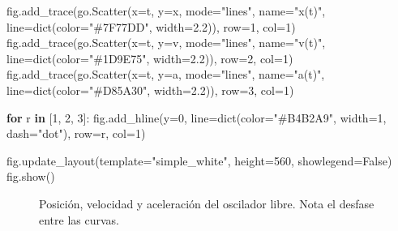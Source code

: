 \documentclass[
  letterpaper,
  DIV=11,
  numbers=noendperiod]{scrreprt}
\newenvironment{Shaded}{\begin{snugshade}}{\end{snugshade}}
\newcommand{\BuiltInTok}[1]{\textcolor[rgb]{0.00,0.23,0.31}{#1}}
\newcommand{\ControlFlowTok}[1]{\textcolor[rgb]{0.00,0.23,0.31}{\textbf{#1}}}
\newcommand{\DecValTok}[1]{\textcolor[rgb]{0.68,0.00,0.00}{#1}}
\newcommand{\FloatTok}[1]{\textcolor[rgb]{0.68,0.00,0.00}{#1}}
\newcommand{\KeywordTok}[1]{\textcolor[rgb]{0.00,0.23,0.31}{\textbf{#1}}}
\newcommand{\NormalTok}[1]{\textcolor[rgb]{0.00,0.23,0.31}{#1}}
\newcommand{\OperatorTok}[1]{\textcolor[rgb]{0.37,0.37,0.37}{#1}}
\newcommand{\StringTok}[1]{\textcolor[rgb]{0.13,0.47,0.30}{#1}}
\newcommand{\VariableTok}[1]{\textcolor[rgb]{0.07,0.07,0.07}{#1}}
\begin{document}
\begin{Shaded}
\begin{Highlighting}[]
\NormalTok{fig.add\_trace(go.Scatter(x}\OperatorTok{=}\NormalTok{t, y}\OperatorTok{=}\NormalTok{x, mode}\OperatorTok{=}\StringTok{"lines"}\NormalTok{, name}\OperatorTok{=}\StringTok{"x(t)"}\NormalTok{, line}\OperatorTok{=}\BuiltInTok{dict}\NormalTok{(color}\OperatorTok{=}\StringTok{"\#7F77DD"}\NormalTok{, width}\OperatorTok{=}\FloatTok{2.2}\NormalTok{)), row}\OperatorTok{=}\DecValTok{1}\NormalTok{, col}\OperatorTok{=}\DecValTok{1}\NormalTok{)}
\NormalTok{fig.add\_trace(go.Scatter(x}\OperatorTok{=}\NormalTok{t, y}\OperatorTok{=}\NormalTok{v, mode}\OperatorTok{=}\StringTok{"lines"}\NormalTok{, name}\OperatorTok{=}\StringTok{"v(t)"}\NormalTok{, line}\OperatorTok{=}\BuiltInTok{dict}\NormalTok{(color}\OperatorTok{=}\StringTok{"\#1D9E75"}\NormalTok{, width}\OperatorTok{=}\FloatTok{2.2}\NormalTok{)), row}\OperatorTok{=}\DecValTok{2}\NormalTok{, col}\OperatorTok{=}\DecValTok{1}\NormalTok{)}
\NormalTok{fig.add\_trace(go.Scatter(x}\OperatorTok{=}\NormalTok{t, y}\OperatorTok{=}\NormalTok{a, mode}\OperatorTok{=}\StringTok{"lines"}\NormalTok{, name}\OperatorTok{=}\StringTok{"a(t)"}\NormalTok{, line}\OperatorTok{=}\BuiltInTok{dict}\NormalTok{(color}\OperatorTok{=}\StringTok{"\#D85A30"}\NormalTok{, width}\OperatorTok{=}\FloatTok{2.2}\NormalTok{)), row}\OperatorTok{=}\DecValTok{3}\NormalTok{, col}\OperatorTok{=}\DecValTok{1}\NormalTok{)}

\ControlFlowTok{for}\NormalTok{ r }\KeywordTok{in}\NormalTok{ [}\DecValTok{1}\NormalTok{, }\DecValTok{2}\NormalTok{, }\DecValTok{3}\NormalTok{]:}
\NormalTok{    fig.add\_hline(y}\OperatorTok{=}\DecValTok{0}\NormalTok{, line}\OperatorTok{=}\BuiltInTok{dict}\NormalTok{(color}\OperatorTok{=}\StringTok{"\#B4B2A9"}\NormalTok{, width}\OperatorTok{=}\DecValTok{1}\NormalTok{, dash}\OperatorTok{=}\StringTok{"dot"}\NormalTok{), row}\OperatorTok{=}\NormalTok{r, col}\OperatorTok{=}\DecValTok{1}\NormalTok{)}

\NormalTok{fig.update\_layout(template}\OperatorTok{=}\StringTok{"simple\_white"}\NormalTok{, height}\OperatorTok{=}\DecValTok{560}\NormalTok{, showlegend}\OperatorTok{=}\VariableTok{False}\NormalTok{)}
\NormalTok{fig.show()}
\end{Highlighting}
\end{Shaded}

\begin{figure}


\caption{\label{fig-osc-1}Posición, velocidad y aceleración del
oscilador libre. Nota el desfase entre las curvas.}

\end{figure}%
\end{document}
